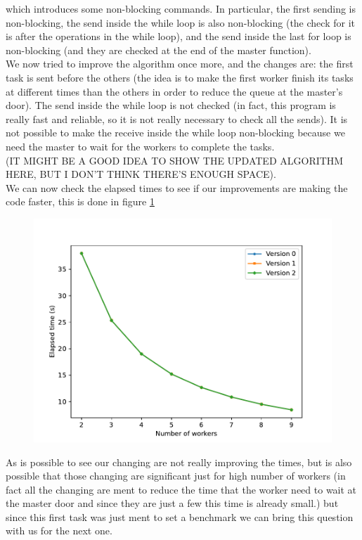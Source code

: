 \documentclass[a4paper]{article}
\theoremstyle{definition}
\theoremstyle{remark}
\begin{document}
which introduces some non-blocking commands. In particular, the first sending is non-blocking, 
the send inside the while loop is also non-blocking (the check for it is after the operations in the while loop), 
and the send inside the last for loop is non-blocking (and they are checked at the end of the master function).\\
We now tried to improve the algorithm once more, and the changes are: the first task is sent before the others 
(the idea is to make the first worker finish its tasks at different times than the others in order to reduce the queue at 
the master's door). The send inside the while loop is not checked (in fact, this program is really fast and reliable, 
so it is not really necessary to check all the sends). It is not possible to make the receive inside the while loop non-blocking 
because we need the master to wait for the workers to complete the tasks.\\
(IT MIGHT BE A GOOD IDEA TO SHOW THE UPDATED ALGORITHM HERE, BUT I DON'T THINK THERE'S ENOUGH SPACE).\\
We can now check the elapsed times to see if our improvements are making the code faster, this is 
done in figure \ref{fig:figure1}
\begin{figure}
    \includegraphics[width=\textwidth]{ex1.pdf}
    \label{fig:figure1}
\end{figure}

As is possible to see our changing are not really improving the times, but is also possible that those changing 
are significant just for high number of workers (in fact all the changing are ment to reduce the time that the worker need to wait 
at the master door and since they are just a few this time is already small.) but since this first task was just ment to 
set a benchmark we can bring this question with us for the next one.
\end{document}
